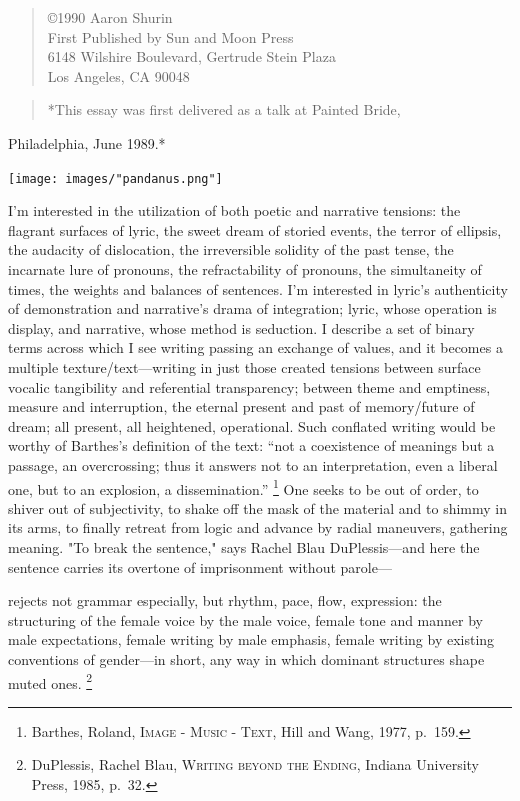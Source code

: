 \documentclass[
]{memoir}
\begin{document}
\begin{verse}
©1990 Aaron Shurin\\
First Published by Sun and Moon Press\\
6148 Wilshire Boulevard, Gertrude Stein Plaza\\
Los Angeles, CA 90048\\
\end{verse}

\begin{verse}
*This essay was first delivered as a talk at Painted Bride,\\
\end{verse}

Philadelphia, June 1989.*

\begin{center}\texttt{[image: images/"pandanus.png"]}\end{center}

I'm interested in the utilization of both poetic and narrative tensions:
the flagrant surfaces of lyric, the sweet dream of storied events, the
terror of ellipsis, the audacity of dislocation, the irreversible
solidity of the past tense, the incarnate lure of pronouns, the
refractability of pronouns, the simultaneity of times, the weights and
balances of sentences. I'm interested in lyric's authenticity of
demonstration and narrative's drama of integration; lyric, whose
operation is display, and narrative, whose method is seduction. I
describe a set of binary terms across which I see writing passing an
exchange of values, and it becomes a multiple texture/text---writing in
just those created tensions between surface vocalic tangibility and
referential transparency; between theme and emptiness, measure and
interruption, the eternal present and past of memory/future of dream;
all present, all heightened, operational. Such conflated writing would
be worthy of Barthes's definition of the text: ``not a coexistence of
meanings but a passage, an overcrossing; thus it answers not to an
interpretation, even a liberal one, but to an explosion, a
dissemination.'' \footnote{Barthes, Roland, \textsc{Image - Music -
  Text}, Hill and Wang, 1977, p.~159.} One seeks to be out of order, to
shiver out of subjectivity, to shake off the mask of the material and to
shimmy in its arms, to finally retreat from logic and advance by radial
maneuvers, gathering meaning. "To break the sentence," says Rachel Blau
DuPlessis---and here the sentence carries its overtone of imprisonment
without parole---

rejects not grammar especially, but rhythm, pace, flow, expression: the
structuring of the female voice by the male voice, female tone and
manner by male expectations, female writing by male emphasis, female
writing by existing conventions of gender---in short, any way in which
dominant structures shape muted ones. \footnote{DuPlessis, Rachel Blau,
  \textsc{Writing beyond the Ending}, Indiana University Press, 1985,
  p.~32.}
\end{document}
